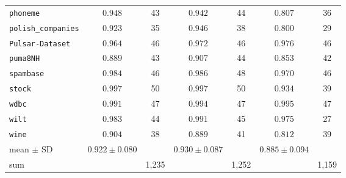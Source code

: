\begin{tabular}{@{}lcccccc@{}}
\texttt{phoneme} & $0.948$ & 43 & $0.942$ & 44 & $0.807$ & 36 \\
\texttt{polish\_companies} & $0.923$ & 35 & $0.946$ & 38 & $0.800$ & 29 \\
\texttt{Pulsar-Dataset} & $0.964$ & 46 & $0.972$ & 46 & $0.976$ & 46 \\
\texttt{puma8NH} & $0.889$ & 43 & $0.907$ & 44 & $0.853$ & 42 \\
\texttt{spambase} & $0.984$ & 46 & $0.986$ & 48 & $0.970$ & 46 \\
\texttt{stock} & $0.997$ & 50 & $0.997$ & 50 & $0.934$ & 39 \\
\texttt{wdbc} & $0.991$ & 47 & $0.994$ & 47 & $0.995$ & 47 \\
\texttt{wilt} & $0.983$ & 44 & $0.991$ & 45 & $0.975$ & 27 \\
\texttt{wine} & $0.904$ & 38 & $0.889$ & 41 & $0.812$ & 39 \\
\midrule mean $\pm$ SD & $0.922 \pm 0.080$ &  & $0.930 \pm 0.087$ &  & $0.885 \pm 0.094$ &  \\
sum &  & 1,235 &  & 1,252 &  & 1,159 \\
\bottomrule\end{tabular}
